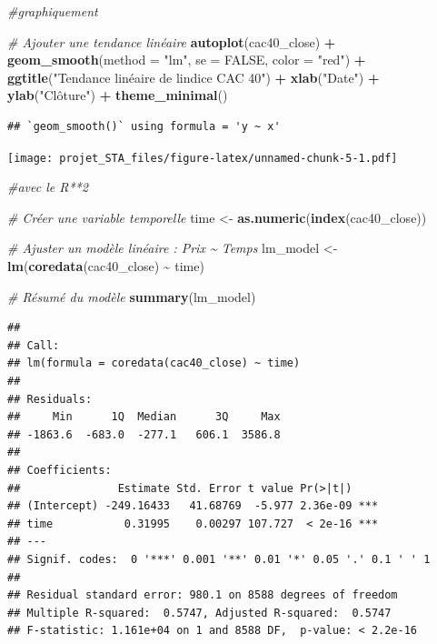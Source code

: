 \documentclass[
]{article}
\newenvironment{Shaded}{\begin{snugshade}}{\end{snugshade}}
\newcommand{\AttributeTok}[1]{\textcolor[rgb]{0.13,0.29,0.53}{#1}}
\newcommand{\CommentTok}[1]{\textcolor[rgb]{0.56,0.35,0.01}{\textit{#1}}}
\newcommand{\ConstantTok}[1]{\textcolor[rgb]{0.56,0.35,0.01}{#1}}
\newcommand{\FunctionTok}[1]{\textcolor[rgb]{0.13,0.29,0.53}{\textbf{#1}}}
\newcommand{\NormalTok}[1]{#1}
\newcommand{\OtherTok}[1]{\textcolor[rgb]{0.56,0.35,0.01}{#1}}
\newcommand{\SpecialCharTok}[1]{\textcolor[rgb]{0.81,0.36,0.00}{\textbf{#1}}}
\newcommand{\StringTok}[1]{\textcolor[rgb]{0.31,0.60,0.02}{#1}}
\begin{document}
\begin{Shaded}
\begin{Highlighting}[]
\CommentTok{\#graphiquement }

\CommentTok{\# Ajouter une tendance linéaire}
\FunctionTok{autoplot}\NormalTok{(cac40\_close) }\SpecialCharTok{+}
  \FunctionTok{geom\_smooth}\NormalTok{(}\AttributeTok{method =} \StringTok{"lm"}\NormalTok{, }\AttributeTok{se =} \ConstantTok{FALSE}\NormalTok{, }\AttributeTok{color =} \StringTok{"red"}\NormalTok{) }\SpecialCharTok{+}
  \FunctionTok{ggtitle}\NormalTok{(}\StringTok{"Tendance linéaire de l\textquotesingle{}indice CAC 40"}\NormalTok{) }\SpecialCharTok{+}
  \FunctionTok{xlab}\NormalTok{(}\StringTok{"Date"}\NormalTok{) }\SpecialCharTok{+}
  \FunctionTok{ylab}\NormalTok{(}\StringTok{"Clôture"}\NormalTok{) }\SpecialCharTok{+}
  \FunctionTok{theme\_minimal}\NormalTok{()}
\end{Highlighting}
\end{Shaded}

\begin{verbatim}
## `geom_smooth()` using formula = 'y ~ x'
\end{verbatim}

\texttt{[image: projet\_STA\_files/figure-latex/unnamed-chunk-5-1.pdf]}

\begin{Shaded}
\begin{Highlighting}[]
\CommentTok{\#avec le R**2}

\CommentTok{\# Créer une variable temporelle}
\NormalTok{time }\OtherTok{\textless{}{-}} \FunctionTok{as.numeric}\NormalTok{(}\FunctionTok{index}\NormalTok{(cac40\_close))}

\CommentTok{\# Ajuster un modèle linéaire : Prix \textasciitilde{} Temps}
\NormalTok{lm\_model }\OtherTok{\textless{}{-}} \FunctionTok{lm}\NormalTok{(}\FunctionTok{coredata}\NormalTok{(cac40\_close) }\SpecialCharTok{\textasciitilde{}}\NormalTok{ time)}

\CommentTok{\# Résumé du modèle}
\FunctionTok{summary}\NormalTok{(lm\_model)}
\end{Highlighting}
\end{Shaded}

\begin{verbatim}
## 
## Call:
## lm(formula = coredata(cac40_close) ~ time)
## 
## Residuals:
##     Min      1Q  Median      3Q     Max 
## -1863.6  -683.0  -277.1   606.1  3586.8 
## 
## Coefficients:
##               Estimate Std. Error t value Pr(>|t|)    
## (Intercept) -249.16433   41.68769  -5.977 2.36e-09 ***
## time           0.31995    0.00297 107.727  < 2e-16 ***
## ---
## Signif. codes:  0 '***' 0.001 '**' 0.01 '*' 0.05 '.' 0.1 ' ' 1
## 
## Residual standard error: 980.1 on 8588 degrees of freedom
## Multiple R-squared:  0.5747, Adjusted R-squared:  0.5747 
## F-statistic: 1.161e+04 on 1 and 8588 DF,  p-value: < 2.2e-16
\end{verbatim}
\end{document}
